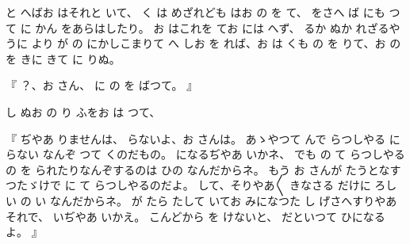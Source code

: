 と
へばお
はそれと
いて、
く
は
めざれども
はお
の
を
て、
をさへ
ば
にも
つて
に
かん
をあらはしたり。
お
はこれを
てお
には
へず、
るか
ぬか
れざるやうに
より
が
の
にかしこまりて
へ
しお
を
れば、お
は
くも
の
を
りて、お
の
を
きに
きて
に
りぬ。

『
？、お
さん、
に
の
を
ばつて。
』

し
ぬお
の
り
ふをお
は
つて、

『
ぢやあ
りませんは、
らないよ、お
さんは。
あゝやつて
んで
らつしやる
に
らない
なんぞ
つて
くのだもの。
になるぢやあ
いかネ、
でも
の
て
らつしやる
の
を
られたりなんぞするのは
ひの
なんだからネ。
もう
お
さんが
たうとなすつたゞけで
に
て
らつしやるのだよ。
して、そりやあ〳〵
きなさる
だけに
ろしい
の
い
なんだからネ。
が
たら
たして
いてお
みになつた
し
げさへすりやあそれで、
いぢやあ
いかえ。
こんどから
を
けないと、
だといつて
ひになるよ。
』

